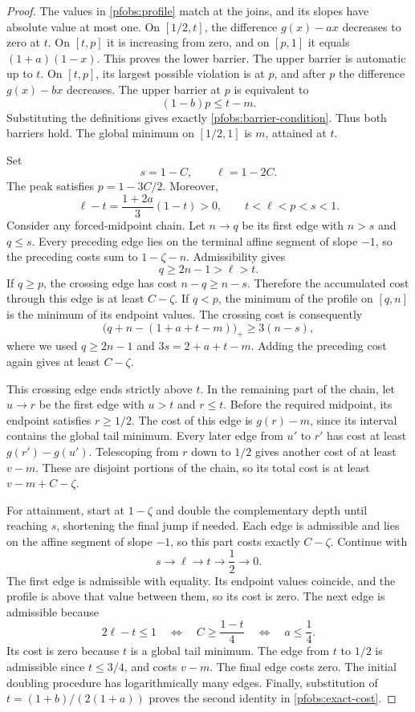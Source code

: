 \begin{proof}
The values in \eqref{pfobs:profile} match at the joins, and its slopes have
absolute value at most one. On \([1/2,t]\), the difference \(g(x)-ax\)
decreases to zero at \(t\). On \([t,p]\) it is increasing from zero, and on
\([p,1]\) it equals \((1+a)(1-x)\). This proves the lower barrier.
The upper barrier is automatic up to \(t\). On \([t,p]\), its largest
possible violation is at \(p\), and after \(p\) the difference \(g(x)-bx\)
decreases. The upper barrier at \(p\) is equivalent to
$$
 (1-b)p\le t-m.
$$
Substituting the definitions gives exactly
\eqref{pfobs:barrier-condition}. Thus both barriers hold. The global minimum
on \([1/2,1]\) is \(m\), attained at \(t\).

Set
$$
 s=1-C,\qquad \ell=1-2C.
$$
The peak satisfies \(p=1-3C/2\). Moreover,
$$
 \ell-t=\frac{1+2a}{3}(1-t)>0,
 \qquad t<\ell<p<s<1.
$$
Consider any forced-midpoint chain. Let \(n\to q\) be its first edge with
\(n>s\) and \(q\le s\). Every preceding edge lies on the terminal affine
segment of slope \(-1\), so the preceding costs sum to \(1-\zeta-n\).
Admissibility gives
$$
 q\ge2n-1>\ell>t.
$$
If \(q\ge p\), the crossing edge has cost \(n-q\ge n-s\). Therefore the
accumulated cost through this edge is at least \(C-\zeta\).
If \(q<p\), the minimum of the profile on \([q,n]\) is the minimum of its
endpoint values. The crossing cost is consequently
$$
 \bigl(q+n-(1+a+t-m)\bigr)_+
 \ge3(n-s),
$$
where we used \(q\ge2n-1\) and \(3s=2+a+t-m\). Adding the preceding
cost again gives at least \(C-\zeta\).

This crossing edge ends strictly above \(t\). In the remaining part of the
chain, let \(u\to r\) be the first edge with \(u>t\) and \(r\le t\).
Before the required midpoint, its endpoint satisfies \(r\ge1/2\). The
cost of this edge is \(g(r)-m\), since its interval contains the global
tail minimum. Every later edge from \(u'\) to \(r'\) has cost at least
\(g(r')-g(u')\). Telescoping from \(r\) down to \(1/2\) gives another
cost of at least \(v-m\). These are disjoint portions of the chain, so its
total cost is at least \(v-m+C-\zeta\).

For attainment, start at \(1-\zeta\) and double the complementary depth
until reaching \(s\), shortening the final jump if needed. Each edge is
admissible and lies on the affine segment of slope \(-1\), so this part
costs exactly \(C-\zeta\). Continue with
$$
 s\longrightarrow\ell\longrightarrow t\longrightarrow\frac12
 \longrightarrow0.
$$
The first edge is admissible with equality. Its endpoint values coincide,
and the profile is above that value between them, so its cost is zero.
The next edge is admissible because
$$
 2\ell-t\le1
 \quad\Longleftrightarrow\quad
 C\ge\frac{1-t}{4}
 \quad\Longleftrightarrow\quad a\le\frac14.
$$
Its cost is zero because \(t\) is a global tail minimum. The edge from
\(t\) to \(1/2\) is admissible since \(t\le3/4\), and costs \(v-m\).
The final edge costs zero. The initial doubling procedure has logarithmically
many edges. Finally, substitution of \(t=(1+b)/(2(1+a))\) proves the second
identity in \eqref{pfobs:exact-cost}.
\end{proof}

